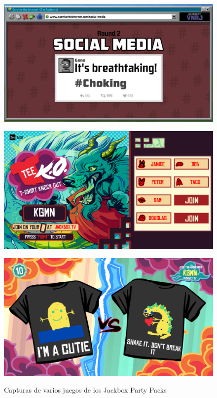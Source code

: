 \begin{figure}[H]
    \centering
    \begin{minipage}{0.40\textwidth}
        \centering
        \includegraphics[width=1.0\textwidth]{5-Cuerpo/Chapter3/JPP1.jpg} %
        \label{JPP-Internet}
    \end{minipage}\hfill
    \begin{minipage}{0.40\textwidth}
        \centering
        \includegraphics[width=1.0\textwidth]{5-Cuerpo/Chapter3/JPP2.jpg} %
        \label{JPP-Inicio}
    \end{minipage}
    \centering
    \begin{minipage}{0.40\textwidth}
        \centering
        \includegraphics[width=1.0\textwidth]{5-Cuerpo/Chapter3/JPP3.jpg} %
        \label{JPP-Tees}
    \end{minipage}
    \caption{Capturas de varios juegos de los Jackbox Party Packs}
\end{figure}

